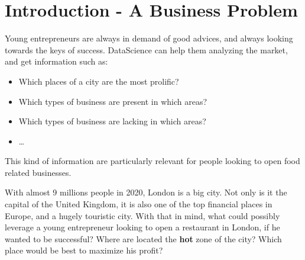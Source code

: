 \documentclass[11pt]{article}
\providecommand{\tightlist}{%
      \setlength{\itemsep}{0pt}\setlength{\parskip}{0pt}}
\begin{document}
\tableofcontents
\newpage



    \hypertarget{introduction---a-business-problem}{%
\section{\texorpdfstring{Introduction - A Business Problem
}{Introduction - A Business Problem }}\label{introduction---a-business-problem}}

Young entrepreneurs are always in demand of good advices, and always
looking towards the keys of success. DataScience can help them analyzing
the market, and get information such as:
\begin{itemize}
\tightlist
\item
    Which places of a city are
the most prolific?
\item
    Which types of business are present in which areas?
\item
    Which types of business are lacking in which areas? 
\item
    \ldots{}
\end{itemize}

This kind of information are particularly relevant for people looking to
open food related businesses.

With almost 9 millions people in 2020, London is a big city. Not only is
it the capital of the United Kingdom, it is also one of the top
financial places in Europe, and a hugely touristic city. With that in
mind, what could possibly leverage a young entrepreneur looking to open
a restaurant in London, if he wanted to be successful? Where are located
the \textbf{hot} zone of the city? Which place would be best to maximize
his profit?
\end{document}
